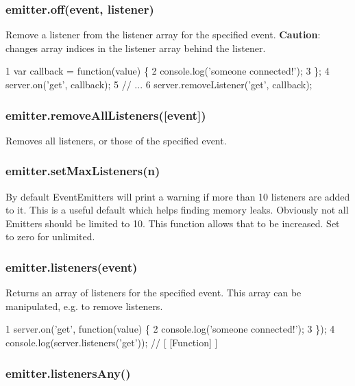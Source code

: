\subsubsection*{emitter.\+off(event, listener)}

Remove a listener from the listener array for the specified event. {\bfseries Caution}\+: changes array indices in the listener array behind the listener.


\begin{DoxyCode}
1 var callback = function(value) \{
2   console.log('someone connected!');
3 \};
4 server.on('get', callback);
5 // ...
6 server.removeListener('get', callback);
\end{DoxyCode}


\subsubsection*{emitter.\+remove\+All\+Listeners(\mbox{[}event\mbox{]})}

Removes all listeners, or those of the specified event.

\subsubsection*{emitter.\+set\+Max\+Listeners(n)}

By default Event\+Emitters will print a warning if more than 10 listeners are added to it. This is a useful default which helps finding memory leaks. Obviously not all Emitters should be limited to 10. This function allows that to be increased. Set to zero for unlimited.

\subsubsection*{emitter.\+listeners(event)}

Returns an array of listeners for the specified event. This array can be manipulated, e.\+g. to remove listeners.


\begin{DoxyCode}
1 server.on('get', function(value) \{
2   console.log('someone connected!');
3 \});
4 console.log(server.listeners('get')); // [ [Function] ]
\end{DoxyCode}


\subsubsection*{emitter.\+listeners\+Any()}

